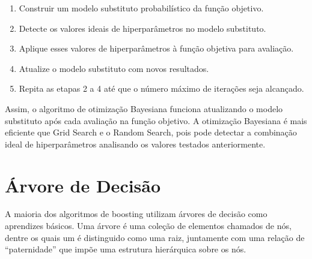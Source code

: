 \begin{enumerate}
    \item Construir um modelo substituto probabilístico da função objetivo. 
    \item Detecte os valores ideais de hiperparâmetros no
modelo substituto.
\item Aplique esses valores de hiperparâmetros à função objetiva para avaliação.
\item Atualize o modelo substituto com novos resultados.
\item Repita as etapas 2 a 4 até que o número máximo de iterações seja
alcançado.
\end{enumerate}

Assim, o algoritmo de otimização Bayesiana funciona atualizando o modelo substituto após cada
avaliação na função objetivo. A otimização Bayesiana é mais eficiente que Grid Search e o Random Search, pois pode detectar a combinação ideal de hiperparâmetros analisando os valores testados anteriormente.


\section{Árvore de Decisão}
A maioria dos algoritmos de boosting utilizam árvores de decisão como aprendizes básicos. 
Uma árvore é uma coleção de elementos chamados de nós, dentre os quais um é distinguido como uma raiz, juntamente com uma relação de “paternidade” que impõe uma estrutura hierárquica sobre os nós.

